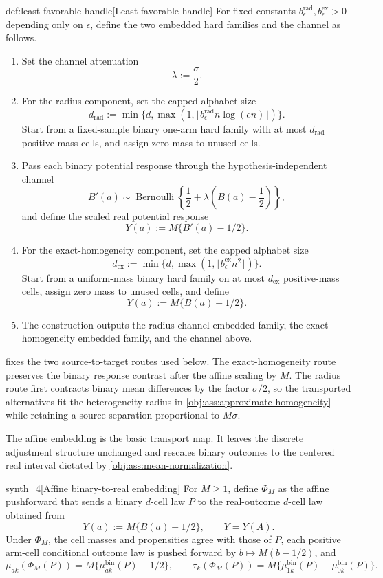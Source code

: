 \documentclass[11pt]{article}
\begin{document}
\begin{algorithmv}{def:least-favorable-handle}[Least-favorable handle]
For fixed constants \(b_{\epsilon}^{\mathrm{rad}},b_{\epsilon}^{\mathrm{ex}}>0\) depending only on \(\epsilon\), define the two embedded hard families and the channel as follows.
\begin{enumerate}
\item Set the channel attenuation
\[
\lambda:=\frac{\sigma}{2}.
\]
\item For the radius component, set the capped alphabet size
\[
d_{\mathrm{rad}}:=\min\{d,\max(1,\lfloor b_{\epsilon}^{\mathrm{rad}}n\log(en)\rfloor)\}.
\]
Start from a fixed-sample binary one-arm hard family with at most \(d_{\mathrm{rad}}\) positive-mass cells, and assign zero mass to unused cells.
\item Pass each binary potential response through the hypothesis-independent channel
\[
B'(a)\sim\operatorname{Bernoulli}\!\left\{\frac12+\lambda\left(B(a)-\frac12\right)\right\},
\]
and define the scaled real potential response
\[
Y(a):=M\{B'(a)-1/2\}.
\]
\item For the exact-homogeneity component, set the capped alphabet size
\[
d_{\mathrm{ex}}:=\min\{d,\max(1,\lfloor b_{\epsilon}^{\mathrm{ex}}n^2\rfloor)\}.
\]
Start from a uniform-mass binary hard family on at most \(d_{\mathrm{ex}}\) positive-mass cells, assign zero mass to unused cells, and define
\[
Y(a):=M\{B(a)-1/2\}.
\]
\item The construction outputs the radius-channel embedded family, the exact-homogeneity embedded family, and the channel above.
\end{enumerate}
\end{algorithmv}

 fixes the two source-to-target routes used below. The exact-homogeneity route preserves the binary response contrast after the affine scaling by \(M\). The radius route first contracts binary mean differences by the factor \(\sigma/2\), so the transported alternatives fit the heterogeneity radius in \cref{obj:ass:approximate-homogeneity} while retaining a source separation proportional to \(M\sigma\).

The affine embedding is the basic transport map. It leaves the discrete adjustment structure unchanged and rescales binary outcomes to the centered real interval dictated by \cref{obj:ass:mean-normalization}.

\begin{definitionv}{synth_4}[Affine binary-to-real embedding]
For \(M\ge1\), define \(\Phi_M\) as the affine pushforward that sends a binary \(d\)-cell law \(P\) to the real-outcome \(d\)-cell law obtained from
\[
Y(a):=M\{B(a)-1/2\},
\qquad
Y=Y(A).
\]
Under \(\Phi_M\), the cell masses and propensities agree with those of \(P\), each positive arm-cell conditional outcome law is pushed forward by \(b\mapsto M(b-1/2)\), and
\[
\mu_{ak}(\Phi_M(P))=M\{\mu_{ak}^{\mathrm{bin}}(P)-1/2\},
\qquad
\tau_k(\Phi_M(P))=M\{\mu_{1k}^{\mathrm{bin}}(P)-\mu_{0k}^{\mathrm{bin}}(P)\}.
\]
\end{definitionv}
\end{document}
